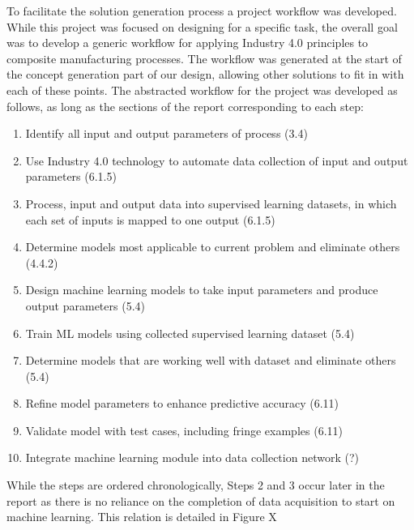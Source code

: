 To facilitate the solution generation process a project workflow was developed. While this project was focused on designing for a specific task, the overall goal was to develop a generic workflow for applying Industry 4.0 principles to composite manufacturing processes. The workflow was generated at the start of the concept generation part of our design, allowing other solutions to fit in with each of these points. The abstracted workflow for the project was developed as follows, as long as the sections of the report corresponding to each step:
\begin{enumerate}
\item Identify all input and output parameters of process (3.4)
\item Use Industry 4.0 technology to automate data collection of input and output parameters (6.1.5)
\item Process, input and output data into supervised learning datasets, in which each set of inputs is mapped to one output (6.1.5)
\item Determine models most applicable to current problem and eliminate others (4.4.2)
\item Design machine learning models to take input parameters and produce output parameters (5.4)
\item Train ML models using collected supervised learning dataset (5.4)
\item Determine models that are working well with dataset and eliminate others (5.4)
\item Refine model parameters to enhance predictive accuracy (6.11)
\item Validate model with test cases, including fringe examples (6.11)
\item Integrate machine learning module into data collection network (?)
\end{enumerate}
While the steps are ordered chronologically, Steps 2 and 3 occur later in the report as there is no reliance on the completion of data acquisition to start on machine learning. This relation is detailed in Figure X